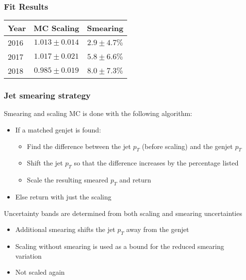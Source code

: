 \documentclass{beamer}
\begin{document}
\begin{frame}
  \frametitle{Fit Results}

  \vfill
  \def\arraystretch{1.5}
  \begin{center}
    \begin{tabular}{|l|c|c|}
      \hline
      Year & MC Scaling & Smearing \\
      \hline
      2016 & $1.013 \pm 0.014$ & $2.9 \pm 4.7 \%$ \\
      2017 & $1.017 \pm 0.021$ & $5.8 \pm 6.6 \%$ \\
      2018 & $0.985 \pm 0.019$ & $8.0 \pm 7.3 \%$ \\
      \hline
    \end{tabular}
  \end{center}


\end{frame}


\begin{frame}
  \frametitle{Jet smearing strategy}

  Smearing and scaling MC is done with the following algorithm:
  \begin{itemize}
  \item If a matched genjet is found:
    \begin{itemize}
    \item Find the difference between the jet $p_T$ (before scaling) and the genjet $p_T$
    \item Shift the jet $p_T$ so that the difference increases by the percentage listed
    \item Scale the resulting smeared $p_T$ and return
    \end{itemize}
  \item Else return with just the scaling
  \end{itemize}

  Uncertainty bands are determined from both scaling and smearing uncertainties
  \begin{itemize}
  \item Additional smearing shifts the jet $p_T$ away from the genjet
  \item Scaling without smearing is used as a bound for the reduced smearing variation
  \item Not scaled again
  \end{itemize}

\end{frame}
\end{document}
